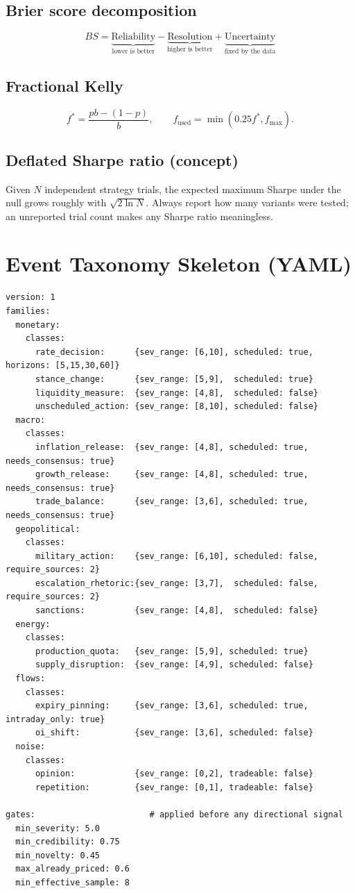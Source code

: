 \section*{Brier score decomposition}
\[
BS = \underbrace{\text{Reliability}}_{\text{lower is better}}
- \underbrace{\text{Resolution}}_{\text{higher is better}}
+ \underbrace{\text{Uncertainty}}_{\text{fixed by the data}}
\]

\section*{Fractional Kelly}
\[
f^{*} = \frac{p b - (1-p)}{b}, \qquad f_{\text{used}} = \min(0.25 f^{*}, f_{\max}).
\]

\section*{Deflated Sharpe ratio (concept)}
Given $N$ independent strategy trials, the expected maximum Sharpe under the null
grows roughly with $\sqrt{2\ln N}$. Always report how many variants were tested;
an unreported trial count makes any Sharpe ratio meaningless.

\chapter{Event Taxonomy Skeleton (YAML)}

\begin{lstlisting}[caption={config/taxonomy.yaml --- abridged}]
version: 1
families:
  monetary:
    classes:
      rate_decision:      {sev_range: [6,10], scheduled: true,  horizons: [5,15,30,60]}
      stance_change:      {sev_range: [5,9],  scheduled: true}
      liquidity_measure:  {sev_range: [4,8],  scheduled: false}
      unscheduled_action: {sev_range: [8,10], scheduled: false}
  macro:
    classes:
      inflation_release:  {sev_range: [4,8], scheduled: true, needs_consensus: true}
      growth_release:     {sev_range: [4,8], scheduled: true, needs_consensus: true}
      trade_balance:      {sev_range: [3,6], scheduled: true, needs_consensus: true}
  geopolitical:
    classes:
      military_action:    {sev_range: [6,10], scheduled: false, require_sources: 2}
      escalation_rhetoric:{sev_range: [3,7],  scheduled: false, require_sources: 2}
      sanctions:          {sev_range: [4,8],  scheduled: false}
  energy:
    classes:
      production_quota:   {sev_range: [5,9], scheduled: true}
      supply_disruption:  {sev_range: [4,9], scheduled: false}
  flows:
    classes:
      expiry_pinning:     {sev_range: [3,6], scheduled: true, intraday_only: true}
      oi_shift:           {sev_range: [3,6], scheduled: false}
  noise:
    classes:
      opinion:            {sev_range: [0,2], tradeable: false}
      repetition:         {sev_range: [0,1], tradeable: false}

gates:                       # applied before any directional signal
  min_severity: 5.0
  min_credibility: 0.75
  min_novelty: 0.45
  max_already_priced: 0.6
  min_effective_sample: 8
\end{lstlisting}

